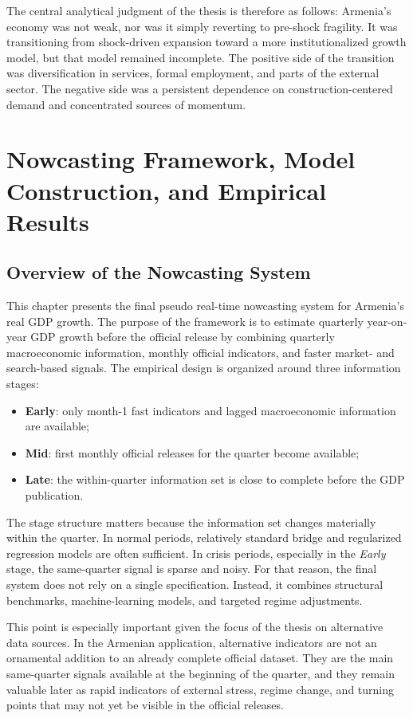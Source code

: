 \documentclass[12pt,a4paper]{report}
\begin{document}
The central analytical judgment of the thesis is therefore as follows: Armenia's economy was not weak, nor was it simply reverting to pre-shock fragility. It was transitioning from shock-driven expansion toward a more institutionalized growth model, but that model remained incomplete. The positive side of the transition was diversification in services, formal employment, and parts of the external sector. The negative side was a persistent dependence on construction-centered demand and concentrated sources of momentum.
\chapter{Nowcasting Framework, Model Construction, and Empirical Results}

\section{Overview of the Nowcasting System}

This chapter presents the final pseudo real-time nowcasting system for Armenia's real GDP growth. The purpose of the framework is to estimate quarterly year-on-year GDP growth before the official release by combining quarterly macroeconomic information, monthly official indicators, and faster market- and search-based signals. The empirical design is organized around three information stages:
\begin{itemize}
    \item \textbf{Early}: only month-1 fast indicators and lagged macroeconomic information are available;
    \item \textbf{Mid}: first monthly official releases for the quarter become available;
    \item \textbf{Late}: the within-quarter information set is close to complete before the GDP publication.
\end{itemize}

The stage structure matters because the information set changes materially within the quarter. In normal periods, relatively standard bridge and regularized regression models are often sufficient. In crisis periods, especially in the \textit{Early} stage, the same-quarter signal is sparse and noisy. For that reason, the final system does not rely on a single specification. Instead, it combines structural benchmarks, machine-learning models, and targeted regime adjustments.

This point is especially important given the focus of the thesis on alternative data sources. In the Armenian application, alternative indicators are not an ornamental addition to an already complete official dataset. They are the main same-quarter signals available at the beginning of the quarter, and they remain valuable later as rapid indicators of external stress, regime change, and turning points that may not yet be visible in the official releases.
\end{document}

